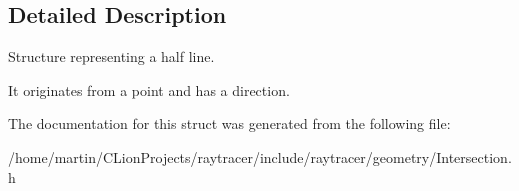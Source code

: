 \subsection{Detailed Description}
Structure representing a half line. 

It originates from a point and has a direction. 

The documentation for this struct was generated from the following file\+:\begin{DoxyCompactItemize}
\item 
/home/martin/\+C\+Lion\+Projects/raytracer/include/raytracer/geometry/Intersection.\+h\end{DoxyCompactItemize}
